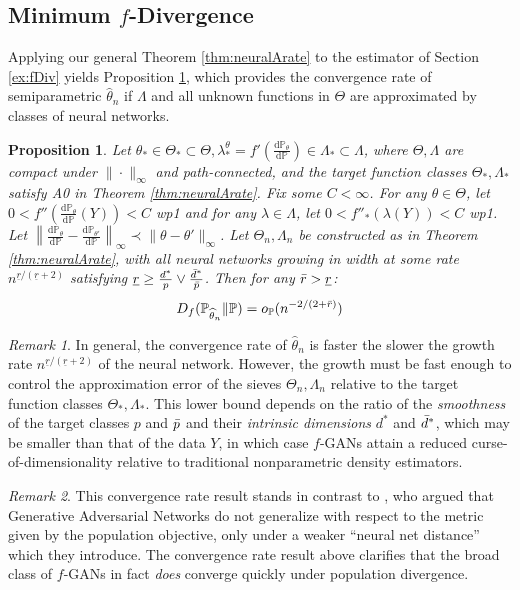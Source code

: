 \documentclass[12pt]{article}
\def\D{\mathrm{d}}
\theoremstyle{myplain}
\newtheorem{proposition}{Proposition}[section]
\theoremstyle{definition}
\theoremstyle{definition}
\theoremstyle{remark}
\newtheorem{remark}{Remark}[section]
\numberwithin{equation}{section}
\begin{document}
\subsection{Minimum $f$-Divergence} \label{app:fDiv}
Applying our general Theorem \ref{thm:neuralArate} to the estimator of Section \ref{ex:fDiv} yields Proposition \ref{thm:fdivrates}, which provides the convergence rate of semiparametric $\widehat\theta_n$ if $\Lambda$ and all unknown functions in $\Theta$ are approximated by classes of neural networks.
\begin{proposition}\label{thm:fdivrates}
Let $\theta_*\in\Theta_*\subset\Theta,\lambda_*^\theta=f'(\frac{\D\mathbb{P}_\theta}{\D\mathbb{P}})\in\Lambda_*\subset\Lambda$, where $\Theta,\Lambda$ are compact under $\|\cdot\|_\infty$ and path-connected, and the target function classes $\Theta_*,\Lambda_*$ satisfy A0 in Theorem \ref{thm:neuralArate}. Fix some $C<\infty$. For any $\theta\in\Theta$, let $0<f''\left(\frac{\D\mathbb{P}_\theta}{\D\mathbb{P}}(Y)\right)<C$ wp1 and for any $\lambda\in\Lambda$, let $0<f''_*(\lambda(Y))<C$ wp1. Let $\left\|\frac{\D\mathbb{P}_\theta}{\D\mathbb{P}}-\frac{\D\mathbb{P}_{\theta'}}{\D\mathbb{P}}\right\|_\infty\prec \|\theta-\theta'\|_\infty$. Let $\Theta_n, \Lambda_n$ be constructed as in Theorem \ref{thm:neuralArate}, with all neural networks growing in width at some rate $n^{\underline{r}/(\underline{r}+2)}$ satisfying $\underline{r}\geq \frac{d^*}{p} \vee \frac{\Bar d^*}{\Bar p}$. Then for any $\Bar{r}>\underline{r}$:
$$D_f(\mathbb{P}_{\widehat{\theta}_n} \| \mathbb{P}) = o_\mathbb{P}(n^{-2/(2+\Bar{r})})$$
\end{proposition}
\begin{remark}
In general, the convergence rate of $\widehat{\theta}_n$ is faster the slower the growth rate $n^{\underline{r}/(\underline{r}+2)}$ of the neural network. However, the growth must be fast enough to control the approximation error of the sieves $\Theta_n, \Lambda_n$ relative to the target function classes $\Theta_*,\Lambda_*$. This lower bound depends on the ratio of the {\it smoothness} of the target classes $p$ and $\Bar p$ and their {\it intrinsic dimensions} $d^*$ and $\Bar d^*$, which may be smaller than that of the data $Y$, in which case $f$-GANs attain a reduced curse-of-dimensionality relative to traditional nonparametric density estimators.
\end{remark}
\begin{remark}
This convergence rate result stands in contrast to \cite{generalizationGAN}, who argued that Generative Adversarial Networks do not generalize with respect to the metric given by the population objective, only under a weaker ``neural net distance'' which they introduce. The convergence rate result above clarifies that the broad class of $f$-GANs in fact {\it does} converge quickly under population divergence.
\end{remark}
\end{document}
